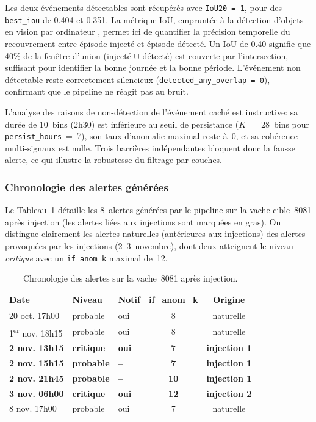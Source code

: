 Les deux événements détectables sont récupérés avec \texttt{IoU20 = 1}, pour des
\texttt{best\_iou} de 0.404 et 0.351. La métrique IoU, empruntée à la détection d'objets
en vision par ordinateur \citep{everingham2010pascal}, permet ici de quantifier la précision
temporelle du recouvrement entre épisode injecté et épisode détecté. Un IoU de 0.40
signifie que 40\% de la fenêtre d'union (injecté $\cup$ détecté) est couverte par
l'intersection, suffisant pour identifier la bonne journée et la bonne période.
L'événement non détectable reste correctement silencieux (\texttt{detected\_any\_overlap = 0}),
confirmant que le pipeline ne réagit pas au bruit.

L'analyse des raisons de non-détection de l'événement caché est instructive: sa durée
de 10~bins (2h30) est inférieure au seuil de persistance ($K$~=~28~bins pour
\texttt{persist\_hours}~=~7), son taux d'anomalie maximal reste à~0, et sa
cohérence multi-signaux est nulle. Trois barrières indépendantes bloquent donc la
fausse alerte, ce qui illustre la robustesse du filtrage par couches.

\subsubsection{Chronologie des alertes générées}

Le Tableau~\ref{tab:alertes_chronologie} détaille les 8~alertes générées par le
pipeline sur la vache cible~8081 après injection (les alertes liées aux injections
sont marquées en gras). On distingue clairement les alertes naturelles (antérieures
aux injections) des alertes provoquées par les injections (2--3~novembre), dont deux
atteignent le niveau \textit{critique} avec un \texttt{if\_anom\_k} maximal de~12.

\begin{table}[H]
    \centering
    \caption{Chronologie des alertes sur la vache~8081 après injection.}
    \label{tab:alertes_chronologie}
    \small
    \begin{tabular}{lllcc}
        \toprule
        \textbf{Date} & \textbf{Niveau} & \textbf{Notif} & \textbf{if\_anom\_k}
            & \textbf{Origine} \\
        \midrule
        20 oct. 17h00 & probable  & oui & 8  & naturelle \\
        1\textsuperscript{er} nov. 18h15 & probable  & oui & 8  & naturelle \\
        \textbf{2 nov. 13h15} & \textbf{critique} & \textbf{oui} & \textbf{7}
            & \textbf{injection 1} \\
        \textbf{2 nov. 15h15} & \textbf{probable} & \textbf{--}  & \textbf{7}
            & \textbf{injection 1} \\
        \textbf{2 nov. 21h45} & \textbf{probable} & \textbf{--}  & \textbf{10}
            & \textbf{injection 1} \\
        \textbf{3 nov. 06h00} & \textbf{critique} & \textbf{oui} & \textbf{12}
            & \textbf{injection 2} \\
        8 nov. 17h00 & probable  & oui & 7  & naturelle \\
        \bottomrule
    \end{tabular}
\end{table}

